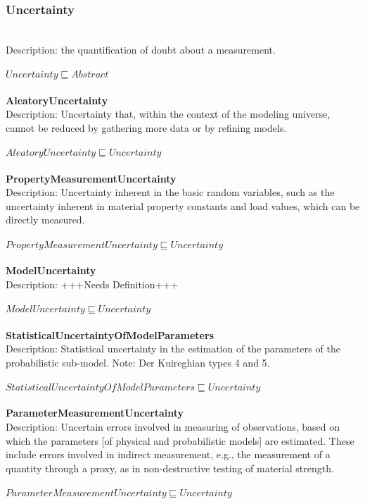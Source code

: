 \subsubsection{Uncertainty}\\
Description: the quantification of doubt about a measurement. \cite{Bell2001}\\
\\$ Uncertainty \sqsubseteq Abstract$
\\\\   \textbf{AleatoryUncertainty}\\Description: Uncertainty that, within the context of the modeling universe, cannot be reduced by gathering more data or by refining models. \cite{Kiureghian2008}\\
\\$ AleatoryUncertainty \sqsubseteq Uncertainty$
\\\\   \textbf{PropertyMeasurementUncertainty}\\Description: Uncertainty inherent in the basic random variables, such as the uncertainty inherent in material property constants and load values, which can be directly measured. \cite{Kiureghian2008}\\
\\$ PropertyMeasurementUncertainty \sqsubseteq Uncertainty$
\\\\   \textbf{ModelUncertainty}\\Description: +++Needs Definition+++\\
\\$ ModelUncertainty \sqsubseteq Uncertainty$
\\\\   \textbf{StatisticalUncertaintyOfModelParameters}\\Description: Statistical uncertainty in the estimation of the parameters of the probabilistic sub-model. Note: Der Kuireghian types 4 and 5. \cite{Kiureghian2008}\\
\\$ StatisticalUncertaintyOfModelParameters \sqsubseteq Uncertainty$
\\\\   \textbf{ParameterMeasurementUncertainty}\\Description: Uncertain errors involved in measuring of observations, based on which the parameters [of physical and probabilistic models] are estimated. These include errors involved in indirect measurement, e.g., the measurement of a quantity through a proxy, as in non-destructive testing of material strength. \cite{Kiureghian2008}\\
\\$ ParameterMeasurementUncertainty \sqsubseteq Uncertainty$
